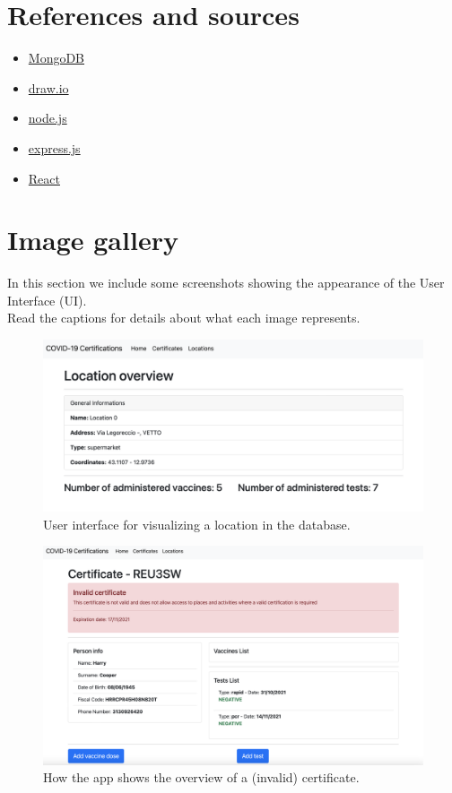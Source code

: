 \documentclass{article}
\begin{document}
\section{References and sources}
\begin{itemize}
    \item \href{https://www.mongodb.com}{MongoDB}
    \item \href{https://app.diagrams.net}{draw.io}
    \item \href{https://nodejs.org}{node.js}
    \item \href{https://expressjs.com}{express.js}
    \item \href{https://reactjs.org/}{React}
\end{itemize}
\section{Image gallery}
In this section we include some screenshots showing the appearance of the User Interface (UI).\\Read the captions for details about what each image represents.
    \begin{figure}[ht!]
    \centering
    \includegraphics[scale=0.3]{screenshots/location.png}
    \caption{User interface for visualizing a location in the database.}
\end{figure}
\begin{figure}[ht!]
    \centering
    \includegraphics[scale=0.3]{screenshots/certificate.png}
    \caption{How the app shows the overview of a (invalid) certificate.}
\end{figure}
\end{document}
